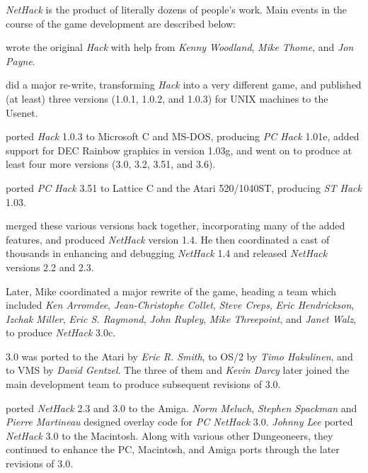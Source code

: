 {\it NetHack\/} is the product of literally dozens of people's work.
Main events in the course of the game development are described below:

\bigskip
{} wrote the original {\it Hack\/} with help from {\it
Kenny Woodland}, {\it Mike Thome}, and {\it Jon Payne}.

\medskip
{} did a major re-write, transforming {\it Hack\/}
into a very different game, and published (at least) three versions (1.0.1,
1.0.2, and 1.0.3) for UNIX machines to the Usenet.

\medskip
{} ported {\it Hack\/} 1.0.3 to Microsoft C and MS-DOS,
producing {\it PC Hack\/} 1.01e, added support for DEC Rainbow graphics in
version 1.03g, and went on to produce at least four more versions (3.0, 3.2,
3.51, and 3.6).

\medskip
{} ported {\it PC Hack\/} 3.51 to Lattice C and the Atari
520/1040ST, producing {\it ST Hack\/} 1.03.

\medskip
{} merged these various versions back together,
incorporating many of the added features, and produced {\it NetHack\/} version
1.4.  He then coordinated a cast of thousands in enhancing and debugging
{\it NetHack\/} 1.4 and released {\it NetHack\/} versions 2.2 and 2.3.

\medskip
\nd Later, Mike coordinated a major rewrite of the game, heading a team which
included {\it Ken Arromdee}, {\it Jean-Christophe Collet}, {\it Steve Creps},
{\it Eric Hendrickson}, {\it Izchak Miller}, {\it Eric S. Raymond}, {\it John
Rupley}, {\it Mike Threepoint}, and {\it Janet Walz}, to produce {\it
NetHack\/} 3.0c.

\medskip
{} 3.0 was ported to the Atari by {\it Eric R. Smith}, to OS/2 by
{\it Timo Hakulinen}, and to VMS by {\it David Gentzel}.  The three of them
and {\it Kevin Darcy\/} later joined the main development team to produce
subsequent revisions of 3.0.

\medskip
{} ported {\it NetHack\/} 2.3 and 3.0 to the Amiga.  {\it
Norm Meluch}, {\it Stephen Spackman\/} and {\it Pierre Martineau\/} designed
overlay code for {\it PC NetHack\/} 3.0.  {\it Johnny Lee\/} ported {\it
NetHack\/} 3.0 to the Macintosh.  Along with various other Dungeoneers, they
continued to enhance the PC, Macintosh, and Amiga ports through the later
revisions of 3.0.

